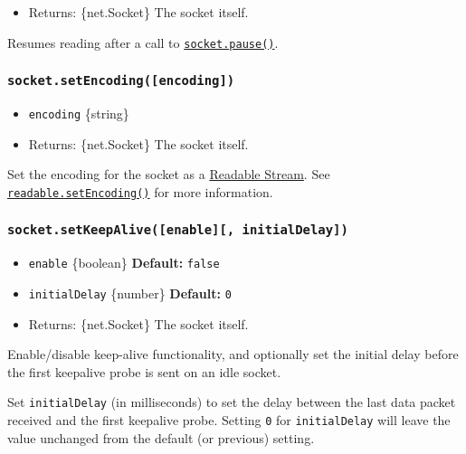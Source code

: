 \begin{itemize}
\tightlist
\item
  Returns: \{net.Socket\} The socket itself.
\end{itemize}

Resumes reading after a call to
\hyperref[socketpause]{\texttt{socket.pause()}}.

\subsubsection{\texorpdfstring{\texttt{socket.setEncoding({[}encoding{]})}}{socket.setEncoding({[}encoding{]})}}\label{socket.setencodingencoding}

\begin{itemize}
\tightlist
\item
  \texttt{encoding} \{string\}
\item
  Returns: \{net.Socket\} The socket itself.
\end{itemize}

Set the encoding for the socket as a
\href{stream.md\#class-streamreadable}{Readable Stream}. See
\href{stream.md\#readablesetencodingencoding}{\texttt{readable.setEncoding()}}
for more information.

\subsubsection{\texorpdfstring{\texttt{socket.setKeepAlive({[}enable{]}{[},\ initialDelay{]})}}{socket.setKeepAlive({[}enable{]}{[}, initialDelay{]})}}\label{socket.setkeepaliveenable-initialdelay}

\begin{itemize}
\tightlist
\item
  \texttt{enable} \{boolean\} \textbf{Default:} \texttt{false}
\item
  \texttt{initialDelay} \{number\} \textbf{Default:} \texttt{0}
\item
  Returns: \{net.Socket\} The socket itself.
\end{itemize}

Enable/disable keep-alive functionality, and optionally set the initial
delay before the first keepalive probe is sent on an idle socket.

Set \texttt{initialDelay} (in milliseconds) to set the delay between the
last data packet received and the first keepalive probe. Setting
\texttt{0} for \texttt{initialDelay} will leave the value unchanged from
the default (or previous) setting.

